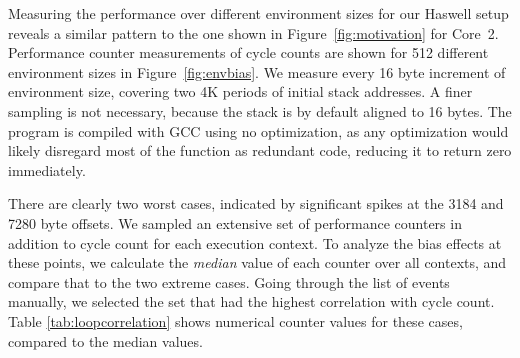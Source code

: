 \documentclass[prodmode,acmtaco]{acmsmall}
\begin{document}
\begin{figure*}[t]
  \caption{Bias from environment size for microkernel. Measured average of 10 cycle count samples for 512 different environments. Spikes show aliasing case, occurring once for each 4K period.}
  \label{fig:envbias}
\end{figure*}

Measuring the performance over different environment sizes for our Haswell setup reveals a similar pattern to the one shown in Figure~\ref{fig:motivation} for Core~2.
Performance counter measurements of cycle counts are shown for 512 different environment sizes in Figure~\ref{fig:envbias}.
We measure every 16 byte increment of environment size, covering two 4K periods of initial stack addresses.
A finer sampling is not necessary, because the stack is by default aligned to 16 bytes.
The program is compiled with {\small{GCC}} using no optimization, as any optimization would likely disregard most of the function as redundant code, reducing it to return zero immediately.

There are clearly two worst cases, indicated by significant spikes at the 3184 and 7280 byte offsets.
We sampled an extensive set of performance counters in addition to cycle count for each execution context.
To analyze the bias effects at these points, we calculate the \emph{median} value of each counter over all contexts, and compare that to the two extreme cases.
Going through the list of events manually, we selected the set that had the highest correlation with cycle count.
Table \ref{tab:loopcorrelation} shows numerical counter values for these cases, compared to the median values.
\end{document}
